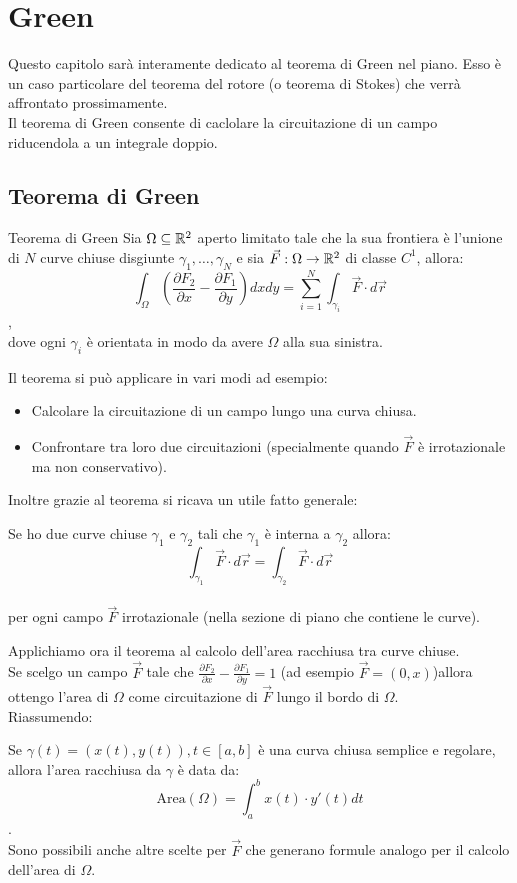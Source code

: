 \chapter{Green}
Questo capitolo sarà interamente dedicato al teorema di Green nel piano. Esso è un caso particolare del teorema del rotore (o teorema di Stokes) che verrà affrontato prossimamente.\\

Il teorema di Green consente di caclolare la circuitazione di un campo riducendola a un integrale doppio.

\section{Teorema di Green}
\begin{teorema}{Teorema di Green}
Sia $\Omega \subseteq \mathbb{R}^2$ aperto limitato tale che la sua frontiera è l'unione di $N$ curve chiuse disgiunte $\gamma_1, \dots, \gamma_N$  e sia $\vec F:\Omega\rightarrow \mathbb{R}^2$ di classe $C^1$, allora:
$$ \int_\Omega \left(\frac{\partial F_2}{\partial x}-\frac{\partial F_1}{\partial y}\right) dxdy = \sum_{i=1}^{N} \int_{\gamma_i} \vec{F} \cdot d\vec{r} $$,\\dove ogni $\gamma_i$ è orientata in modo da avere $\Omega$ alla sua sinistra.
\end{teorema}

Il teorema si può applicare in vari modi ad esempio:
\begin{itemize}
\item Calcolare la circuitazione di un campo lungo una curva chiusa.
\item Confrontare tra loro due circuitazioni (specialmente quando $\vec F$ è irrotazionale ma non conservativo).
\end{itemize}

Inoltre grazie al teorema si ricava un utile fatto generale:
\begin{corollario}{}
  Se ho due curve chiuse $\gamma_1$ e $\gamma_2$ tali che $\gamma_1$ è interna a $\gamma_2$ allora: $$\int_{\gamma_1} \vec F \cdot d\vec r = \int_{\gamma_2} \vec F \cdot d\vec r$$\\
  per ogni campo $\vec F$ irrotazionale (nella sezione di piano che contiene le curve).
\end{corollario}

Applichiamo ora il teorema al calcolo dell'area racchiusa tra curve chiuse.\\
Se scelgo un campo $\vec F$ tale che $\frac{\partial F_2}{\partial x}-\frac{\partial F_1}{\partial y}=1$ (ad esempio $\vec F = (0,x)$)allora ottengo l'area di $\Omega$ come circuitazione di $\vec F$ lungo il bordo di $\Omega$.\\
Riassumendo:
\begin{teorema}{}
  Se $\gamma(t)= (x(t), y(t)), t \in [a,b]$ è una curva chiusa semplice e regolare, allora l'area racchiusa da $\gamma$ è data da:
  $$\text{Area}(\Omega) = \int_{a}^{b} x(t)\cdot y'(t) dt$$.\\
  Sono possibili anche altre scelte per $\vec F$ che generano formule analogo per il calcolo dell'area di $\Omega$.
\end{teorema}

